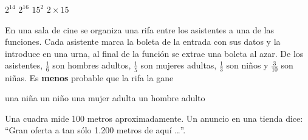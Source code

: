 \documentclass[10pt,letterpaper,addpoints]{exam}
\begin{document}
\begin{questions}
\begin{oneparchoices}
\CorrectChoice $2^{14}$
\choice $2^{16}$
\choice $15^{2}$
\choice $2\times 15$
\end{oneparchoices}
\question En una sala de cine se organiza una rifa entre los asistentes a una de las funciones. Cada asistente marca la boleta de la entrada con sus datos y la introduce en una urna, al final de la función se extrae una boleta al azar. De los asistentes, $\frac{1}{6}$ son hombres adultos, $\frac{1}{5}$ son mujeres adultas, $\frac{1}{3}$ son niños y  $\frac{3}{10}$     son niñas. Es \textbf{menos} probable que la rifa la gane

\begin{oneparchoices}
\choice una niña
\choice un niño
\choice una mujer adulta
\CorrectChoice un hombre adulto
\end{oneparchoices}
\question Una cuadra mide 100 metros aproximadamente. Un anuncio en una tienda dice: “Gran oferta a tan sólo 1.200 metros de aquí \ldots ”. 

\end{questions}
\end{document}
